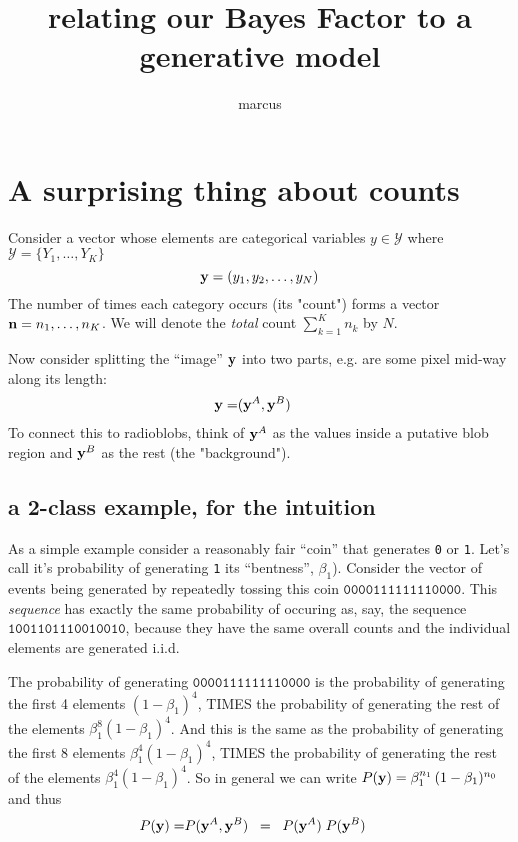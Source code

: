 \documentclass[12pt]{article}
\title{relating our Bayes Factor to a generative model}
\author{marcus}
\date{}
\begin{document}
\maketitle

\section{A surprising thing about counts}

Consider a vector whose elements are categorical variables $y \in \mathcal{Y} $ where $\mathcal{Y} = \{Y_1,\ldots,Y_K \}$
\[
\mathbf{y} = (y_1,y_2, \ldots, y_N) \]
The number of times each category occurs (its "count") forms a vector
$ \mathbf{n} = n_1,\ldots,n_K  $. We will denote the {\it total} count $\sum_{k=1}^K n_k$ by $N$.

Now consider splitting the ``image'' $\mathbf{y}$ into two parts, e.g. are some pixel mid-way along its length:
\begin{align*}
\mathbf{y} =& (\mathbf{y}^A, \mathbf{y}^B)
\end{align*}
To connect this to radioblobs, think of $\mathbf{y}^A$ as the values inside a putative blob region and $\mathbf{y}^B$ as the rest (the "background").

\subsection{a 2-class example, for the intuition}

As a simple example consider a reasonably fair ``coin'' that
generates \texttt{0} or \texttt{1}. Let's call it's probability of
generating \texttt{1} its ``bentness'', $\beta_1$).  Consider the vector
of events being generated by repeatedly tossing this coin
$\mathtt{0000111111110000}$.  This {\it sequence} has exactly the same
probability of occuring as, say, the sequence
$\mathtt{1001101110010010}$, because they have the same overall counts
and the individual elements are generated i.i.d.

The probability of generating
$\mathtt{0000111111110000}$ is the probability of generating the first
4 elements $(1-\beta_1)^4$, TIMES the probability of generating the rest
of the elements $\beta_1^8 (1-\beta_1)^4$. And this is the same as the
probability of generating the first 8 elements $\beta_1^4(1-\beta_1)^4$,
TIMES the probability of generating the rest of the elements $\beta_1^4
(1-\beta_1)^4$. So in general we can write $P(\mathbf{y}) = \beta_1^{n_1} \, (1-\beta_1)^{n_0}$ and  thus
\begin{align*}
P(\mathbf{y}) =& P(\mathbf{y}^A , \mathbf{y}^B)
\;\; = \;\; P(\mathbf{y}^A) \; P(\mathbf{y}^B)
\end{align*}
\end{document}
